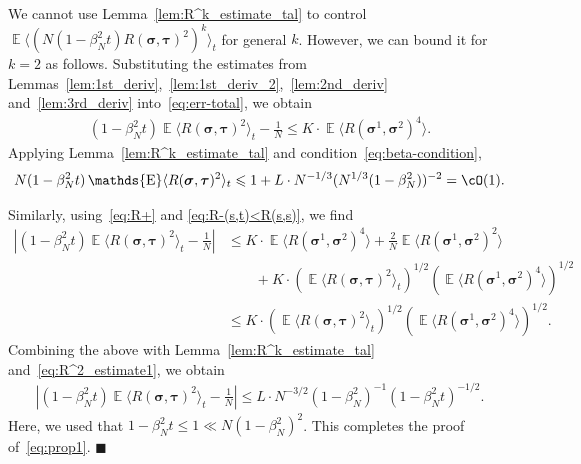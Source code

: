 \documentclass[letterpaper,11pt,reqno]{amsart}
\renewcommand{\le}{\leqslant}
\renewcommand{\leq}{\leqslant}
\newcommand{\ra}{\rangle}
\newcommand{\la}{\langle}
\newcommand{\abs}[1]{\left\vert#1\right\vert}
\def\qed{ \hfill $\blacksquare$}
\newcommand{\mvgs}{\boldsymbol{\sigma}}\newcommand{\mvgS}{\boldsymbol{\Sigma}}\newcommand{\mvgt}{\boldsymbol{\tau}}
\DeclareMathOperator{\E}{\mathds{E}}
\begin{document}
We cannot use Lemma~\ref{lem:R^k_estimate_tal} to control $\E \la ( N (1-\beta_N^2 t)R(\mvgs, \mvgt)^2 )^k\ra_{t}$ for general $k$. However,  we can bound it for $k=2$ as follows.
Substituting the estimates from Lemmas~\ref{lem:1st_deriv},~\ref{lem:1st_deriv_2},~\ref{lem:2nd_deriv} and~\ref{lem:3rd_deriv} into~\eqref{eq:err-total}, we obtain
\begin{align*}
    (1-\beta_{N}^2 t) \E \la R(\mvgs, \mvgt)^2\ra_{t} - \frac{1}{N} 
    \leq K \cdot \E \la R(\mvgs^1, \mvgs^2)^4\ra.
\end{align*}
Applying Lemma~\ref{lem:R^k_estimate_tal} and condition~\eqref{eq:beta-condition},
\begin{align}\label{eq:R^2_estimate1}
    N(1-\beta_{N}^2 t) \E \la R(\mvgs, \mvgt)^2\ra_{t} 
    \leq 1+L \cdot N^{-1/3} (N^{1/3}(1- \beta_N^2))^{-2} =\cO(1).
\end{align}


Similarly, using~\eqref{eq:R+} and \eqref{eq:R-(s,t)<R(s,s)}, we find
\begin{align*}
    \abs{ (1-\beta_N^2 t) \E \la R(\mvgs, \mvgt)^2\ra_{t} - \frac{1}{N} }
    &\leq K \cdot \E \la R(\mvgs^1, \mvgs^2)^4\ra + \frac{2}{N} \E\la R(\mvgs^1, \mvgs^2)^2 \ra\\
    &\qquad + K \cdot (\E \la R(\mvgs, \mvgt)^{2}\ra_{t})^{1/2} (\E \la R(\mvgs^1, \mvgs^2)^4\ra)^{1/2}\\
    &\leq  K \cdot (\E \la R(\mvgs, \mvgt)^{2}\ra_{t})^{1/2} (\E \la R(\mvgs^1, \mvgs^2)^4\ra)^{1/2}.
\end{align*}
Combining the above with Lemma~\ref{lem:R^k_estimate_tal} and~\eqref{eq:R^2_estimate1}, we obtain
\begin{align*}
    \abs{ (1-\beta_N^2 t) \E \la R(\mvgs, \mvgt)^2\ra_{t} - \frac{1}{N} }
    \leq L \cdot N^{-3/2} (1-\beta_N^2)^{-1} (1-\beta_N^2 t)^{-1/2}.
\end{align*}
Here, we used that $1-\beta_{N}^{2}t\le 1 \ll N(1-\beta_{N}^{2})^{2}$.
This completes the proof of~\eqref{eq:prop1}.\qed
\end{document}
